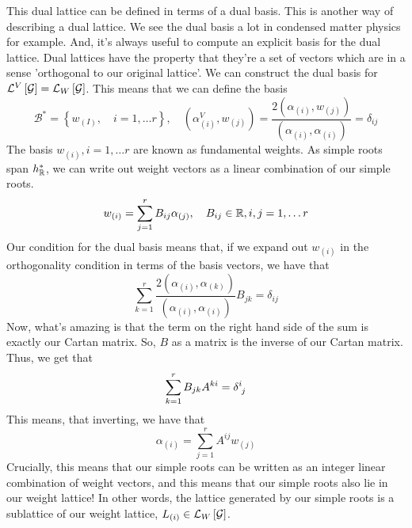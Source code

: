  This dual lattice can be defined in terms of a dual basis. 
 This is another way of describing a dual lattice.
 We see the dual basis a lot in condensed matter physics 
 for example. And, it's always useful to compute an explicit 
 basis for the dual lattice. Dual lattices have the property 
 that they're a set of vectors which are in a sense 'orthogonal 
 to our original lattice'. 
 We can construct the dual basis for $ \mathcal{ L }^ V \left[  \mathcal{ G }  \right]  = 
 \mathcal{ L } _ W \left[  \mathcal{ G } \right]  $. 
 This means that we can define the basis 
 \[
	 \mathcal{ B } ^ *  = \left\{  w_{ \left( I  \right)  } , \quad i  = 1 , \dots r  \right\} , 
	 \quad \left( \alpha^ V  _{ \left( i  \right)  }, w _{ \left( j   \right)  } \right)   = 
	 \frac{ 2 \left( \alpha _{ \left( i  \right)  }, w _{ \left( j  \right)  } \right) }{ 
	 \left( \alpha _{ \left( i  \right)  } , \alpha _{ \left( i   \right)  }  \right)  }  = \delta _{ ij }
 \] The basis $ w _{ \left( i   \right)  } , i = 1 , \dots r $ are known as 
 fundamental weights. 
 As simple roots span $ h _{ \mathbb{R} } ^ * $, we can write out 
 weight vectors as a linear combination of our simple roots. 
 \[
	 w_{\left(  i  \right)  } = \sum _{ j = 1 } ^ r B _{ ij } \alpha _{ \left( j  \right)  } , 
	 \quad B _{ ij } \in \mathbb{R} , i  , j = 1 , \dots r 
 \] Our condition for the dual basis means 
 that, if we expand out $ w _{ \left( i  \right)  } $ in 
 the orthogonality condition in terms of the basis vectors, we have that \[
	 \sum_{ k = 1 } ^ r \frac{ 2 \left( \alpha _{ \left( i  \right)  } , \alpha _{ \left( k  \right)  }  \right)  }{ \left(  \alpha_{ \left( i  \right)  } , \alpha _{ \left( i  \right)  }    \right)  } B _{ jk}  = \delta _{ ij}
 \] Now, what's amazing is that the term on the right hand side 
 of the sum is exactly our Cartan matrix. So, 
 $ B $ as a matrix is the inverse of our Cartan matrix. 
 Thus, we get that 
 \[
	 \sum _{ k = 1 } ^ r B _{ jk } A ^{ ki } = \delta \indices{ ^ i _ j  }  
 \] This means, that inverting, 
 we have that 
 \[
	 \alpha _{ \left( i  \right)  }  = \sum _{ j = 1 } ^ r A ^{ ij } w _{ \left( j  \right)  } 
 \] Crucially, this means 
 that our simple roots can be written as an integer 
 linear combination of weight vectors, and this means that our simple roots also lie in 
 our weight lattice! In other words, 
 the lattice generated by our simple roots 
 is a sublattice of our weight lattice, $ L _{ \left( i  \right)  } \in \mathcal{ L } _ W \left[  \mathcal{ G }  \right]  $. 
